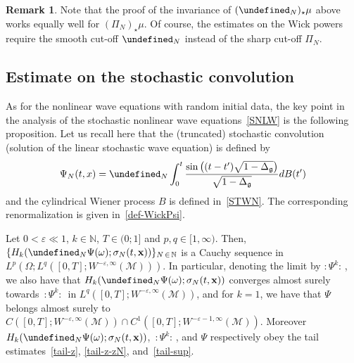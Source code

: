\documentclass[10pt]{amsart}
\theoremstyle{definition}\newtheorem{defi}[theo]{Definition}\newtheorem{rema}[theo]{Remark}\newtheorem{exam}[theo]{Example}\newtheorem{exem}[theo]{Example}\newtheorem{nota}[theo]{Notation}
\newcommand{\N}{\mathbb{N}}
\let\P= \undefined
\newcommand{\P}{\mathbf{P}}
\newcommand{\x}{\mathbf{x}}
\newcommand{\M}{\mathcal{M}}
\newcommand{\g}{\mathfrak{g}}
\newcommand{\Dlg}{\Delta_{\g}}
\newcommand{\eps}{\varepsilon}
\newcommand{\s}{\sigma}
\renewcommand{\o}{\omega}
\renewcommand{\O}{\Omega}
\begin{document}
\begin{rema}
Note that the proof of the invariance of $(\P_N)_{\star}\mu$ above works equally well for $(\Pi_N)_{\star}\mu$. Of course, the estimates on the Wick powers require the smooth cut-off $\P_N$ instead of the sharp cut-off $\Pi_N$.
\end{rema}

\subsection{Estimate on the stochastic convolution} 
As for the nonlinear wave equations with random initial data, the key point in the analysis of the stochastic nonlinear wave equations~\eqref{SNLW} is the following proposition. Let us recall here that the (truncated) stochastic convolution (solution of the linear stochastic wave equation) is defined by
\begin{equation*}
\Psi_N(t,x)=\P_N\int_0^t\frac{\sin\big((t-t')\sqrt{1-\Dlg}\big)}{\sqrt{1-\Dlg}}dB(t')
\end{equation*}
and the cylindrical Wiener process $B$ is defined in~\eqref{STWN}. The corresponding renormalization is given in~\eqref{def-WickPsi}.

\begin{prop}\label{prop-psi}
Let $0<\eps\ll 1$, $k \in\N$, $T \in (0;1]$ and $p,q \in [1,\infty)$. Then, 
$\{H_k(\P_N\Psi(\o);\s_N(t,\x))\}_{N\,\in\,\N}$
is a Cauchy sequence in
$L^p(\O;L^q([0,T];W^{-\eps,\infty}(\M)))$. In particular, denoting the limit by $:\Psi^k\!:\,$, we also have that $H_k(\P_N\Psi(\o);\s_N(t,\x))$ converges almost surely towards $ \,:\!\Psi^k\!:\,$ in $L^q([0,T];W^{-\eps,\infty}(\M))$, and for $k=1$, we have that $\Psi$ belongs almost surely to $C([0,T];W^{-\eps,\infty}(\M))\cap C^1([0,T];W^{-\eps-1,\infty}(\M))$. Moreover $H_k(\P_N\Psi(\o);\s_N(t,\x))$, $\,:\!\Psi^k\!:\,$, and $\Psi$ respectively obey the tail estimates~\eqref{tail-z}, \eqref{tail-z-zN}, and~\eqref{tail-sup}.
\end{prop}
\end{document}
